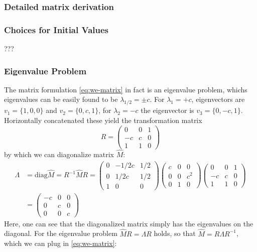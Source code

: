 \subsubsection{Detailed matrix derivation}
\subsubsection{Choices for Initial Values}
???

\subsubsection{Eigenvalue Problem}
The matrix formulation \ref{eq:we-matrix} in fact is an eigenvalue problem, whichs eigenvalues can be easily found to be $\lambda_{1/2} = \pm c$. For $\lambda_1 = + c$, eigenvectors are $v_1 = \{1,0,0\}$ and $v_2 = \{0,c,1\}$, for $\lambda_2 = -c$ the eigenvector is $v_3 = \{0, -c, 1\}$.
Horizontally concatenated these yield the transformation matrix
\[  R =
\begin{pmatrix}
	0 & 0 & 1 \\
	-c & c & 0 \\
	1 & 1 & 0
\end{pmatrix}
\]
by which we can diagonalize matrix $\hat{M}$:
\begin{align*}
	\Lambda &= \text{diag} \hat{M} = R^{-1} \hat{M} R =
	\begin{pmatrix}
	0 & -1/2c & 1/2\\
	0 & 1/2c & 1/2 \\
	1 & 0 & 0
	\end{pmatrix}
	\begin{pmatrix}
		c & 0 & 0 \\
		0 & 0 & c^2 \\
		0 & 1 & 0
	\end{pmatrix}
	\begin{pmatrix}
		0 & 0 & 1 \\
		-c & c & 0 \\
		1 & 1 & 0
	\end{pmatrix} \\
 &=
 \begin{pmatrix}
 	-c & 0 & 0 \\
 	0 & c & 0 \\
 	0 & 0& c
 \end{pmatrix}
\end{align*}
Here, one can see that the diagonalized matrix simply has the eigenvalues on the diagonal.
For the eigenvalue problem $\hat{M} R = \Lambda R$ holds, so that $\hat{M} = R \Lambda R^{-1}$, which we can plug in \ref{eq:we-matrix}:

